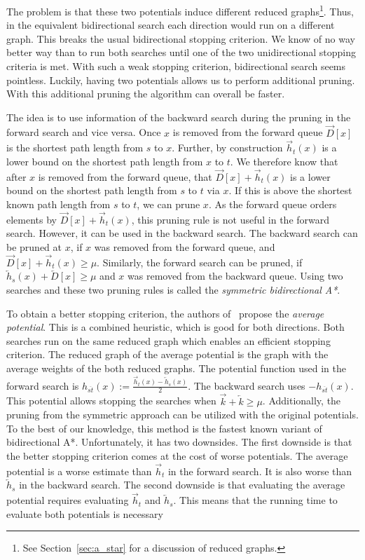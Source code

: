 \documentclass[manuscript,review]{acmart}
\begin{document}
The problem is that these two potentials induce different reduced graphs\footnote{See Section~\ref{sec:a_star} for a discussion of reduced graphs.}.
Thus, in the equivalent bidirectional search each direction would run on a different graph.
This breaks the usual bidirectional stopping criterion.
We know of no way better way than to run both searches until one of the two unidirectional stopping criteria is met.
With such a weak stopping criterion, bidirectional search seems pointless.
Luckily, having two potentials allows us to perform additional pruning.
With this additional pruning the algorithm can overall be faster.

The idea is to use information of the backward search during the pruning in the forward search and vice versa.
Once $x$ is removed from the forward queue $\overrightarrow{D}[x]$ is the shortest path length from $s$ to $x$.
Further, by construction $\overrightarrow{h}_t(x)$ is a lower bound on the shortest path length from $x$ to $t$.
We therefore know that after $x$ is removed from the forward queue, that $\overrightarrow{D}[x] + \overrightarrow{h}_t(x)$ is a lower bound on the shortest path length from $s$ to $t$ via $x$.
If this is above the shortest known path length from $s$ to $t$, we can prune $x$.
As the forward queue orders elements by $\overrightarrow{D}[x] + \overrightarrow{h}_t(x)$, this pruning rule is not useful in the forward search.
However, it can be used in the backward search.
The backward search can be pruned at $x$, if $x$ was removed from the forward queue, and $\overrightarrow{D}[x] + \overrightarrow{h}_t(x)\ge \mu$.
Similarly, the forward search can be pruned, if $\overleftarrow{h}_s(x) + \overleftarrow{D}[x]\ge \mu$ and $x$ was removed from the backward queue.
Using two searches and these two pruning rules is called the \emph{symmetric bidirectional A*}.

To obtain a better stopping criterion, the authors of~\cite{gh-cspas-05} propose the \emph{average potential}.
This is a combined heuristic, which is good for both directions.
Both searches run on the same reduced graph which enables an efficient stopping criterion.
The reduced graph of the average potential is the graph with the average weights of the both reduced graphs.
The potential function used in the forward search is $h_{\overline{st}}(x) := \frac{\overrightarrow{h}_t(x) - \overleftarrow{h}_s(x)}{2}$.
The backward search uses $-h_{\overline{st}}(x)$.
This potential allows stopping the searches when $\overrightarrow{k} + \overleftarrow{k} \geq \mu$.
Additionally, the pruning from the symmetric approach can be utilized with the original potentials.
To the best of our knowledge, this method is the fastest known variant of bidirectional A*.
Unfortunately, it has two downsides.
The first downside is that the better stopping criterion comes at the cost of worse potentials.
The average potential is a worse estimate than $\overrightarrow{h}_t$ in the forward search.
It is also worse than $\overleftarrow{h}_s$ in the backward search.
The second downside is that evaluating the average potential requires evaluating $\overrightarrow{h}_t$ and $\overleftarrow{h}_s$.
This means that the running time to evaluate both potentials is necessary
\end{document}
